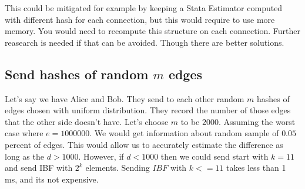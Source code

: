 \documentclass[11pt]{article}
\begin{document}
This could be mitigated for example by keeping a Stata Estimator computed with different hash for each connection, but this would require to use more memory.
You would need to recompute this structure on each connection.
Further reasearch is needed if that can be avoided.
Though there are better solutions.
\subsection{Send hashes of random $m$ edges}
Let's say we have Alice and Bob.
They send to each other random $m$ hashes of edges chosen with uniform distribution.
They record the number of those edges that the other side doesn't have.
Let's choose $m$ to be $2000$.
Assuming the worst case where $e = 1000000$.
We would get information about random sample of $0.05$ percent of edges.
This would allow us to accurately estimate the difference as long as the $d > 1000$.
However, if $d < 1000$ then we could send start with $k = 11$ and send IBF with $2^k$ elements.
Sending $IBF$ with $k <= 11$ takes less than 1 ms, and its not expensive.
\end{document}
